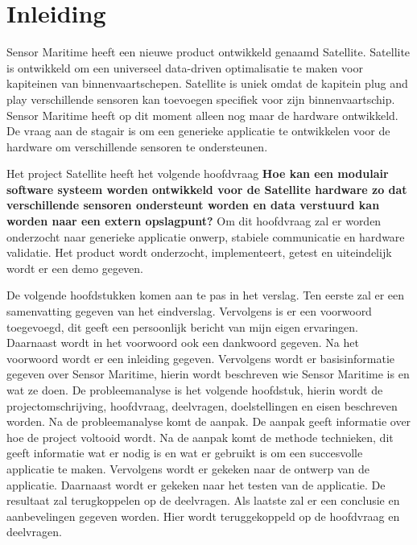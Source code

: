 \chapter{Inleiding}
Sensor Maritime heeft een nieuwe product ontwikkeld genaamd Satellite. Satellite is ontwikkeld om een universeel data-driven optimalisatie te maken voor kapiteinen van binnenvaartschepen. Satellite is uniek omdat de kapitein plug and play verschillende sensoren kan toevoegen specifiek voor zijn binnenvaartschip. Sensor Maritime heeft op dit moment alleen nog maar de hardware ontwikkeld. De vraag aan de stagair is om een generieke applicatie te ontwikkelen voor de hardware om verschillende sensoren te ondersteunen.\newline

\noindent Het project Satellite heeft het volgende hoofdvraag \textbf{Hoe kan een modulair software systeem worden ontwikkeld voor de Satellite hardware zo dat verschillende sensoren ondersteunt worden en data verstuurd kan worden naar een extern opslagpunt?} Om dit hoofdvraag zal er worden onderzocht naar generieke applicatie onwerp, stabiele communicatie en hardware validatie. Het product wordt onderzocht, implementeert, getest en uiteindelijk wordt er een demo gegeven. \newline


\noindent De volgende hoofdstukken komen aan te pas in het verslag. Ten eerste zal er een samenvatting gegeven van het eindverslag. Vervolgens is er een voorwoord toegevoegd, dit geeft een persoonlijk bericht van mijn eigen ervaringen. Daarnaast wordt in het voorwoord ook een dankwoord gegeven. Na het voorwoord wordt er een inleiding gegeven. Vervolgens wordt er basisinformatie gegeven over Sensor Maritime, hierin wordt beschreven wie Sensor Maritime is en wat ze doen. De probleemanalyse is het volgende hoofdstuk, hierin wordt de projectomschrijving, hoofdvraag, deelvragen, doelstellingen en eisen beschreven worden. Na de probleemanalyse komt de aanpak. De aanpak geeft informatie over hoe de project voltooid wordt. Na de aanpak komt de methode technieken, dit geeft informatie wat er nodig is en wat er gebruikt is om een succesvolle applicatie te maken. Vervolgens wordt er gekeken naar de ontwerp van de applicatie. Daarnaast wordt er gekeken naar het testen van de applicatie. De resultaat zal terugkoppelen op de deelvragen. Als laatste zal er een conclusie en aanbevelingen gegeven worden. Hier wordt teruggekoppeld op de hoofdvraag en deelvragen.
